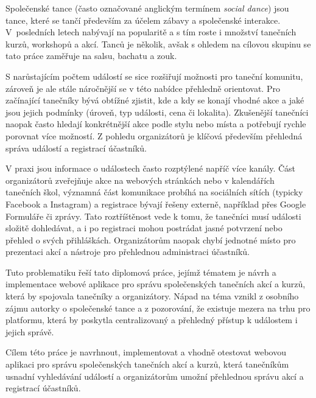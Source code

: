 Společenské tance (často označované anglickým termínem \emph{social dance}) jsou tance, které se tančí především za účelem zábavy a společenské interakce. V~posledních letech nabývají na popularitě a s tím roste i množství tanečních kurzů, workshopů a akcí. Tanců je několik, avšak s ohledem na cílovou skupinu se tato práce zaměřuje na salsu, bachatu a zouk.

S narůstajícím počtem událostí se sice rozšiřují možnosti pro taneční komunitu, zároveň je ale stále náročnější se v této nabídce přehledně orientovat. Pro začínající tanečníky bývá obtížné zjistit, kde a kdy se konají vhodné akce a jaké jsou jejich podmínky (úroveň, typ události, cena či lokalita). Zkušenější tanečníci naopak často hledají konkrétnější akce podle stylu nebo místa a potřebují rychle porovnat více možností. Z pohledu organizátorů je klíčová především přehledná správa událostí a registrací účastníků.

V praxi jsou informace o událostech často rozptýlené napříč více kanály. Část organizátorů zveřejňuje akce na webových stránkách nebo v kalendářích tanečních škol, významná část komunikace probíhá na sociálních sítích (typicky Facebook a Instagram) a registrace bývají řešeny externě, například přes Google Formuláře či zprávy. Tato roztříštěnost vede k tomu, že tanečníci musí události složitě dohledávat, a i po registraci mohou postrádat jasné potvrzení nebo přehled o svých přihláškách. Organizátorům naopak chybí jednotné místo pro prezentaci akcí a nástroje pro přehlednou administraci účastníků.

Tuto problematiku řeší tato diplomová práce, jejímž tématem je návrh a implementace webové aplikace pro správu společenských tanečních akcí a kurzů, která by spojovala tanečníky a organizátory. Nápad na téma vznikl z osobního zájmu autorky o společenské tance a z pozorování, že existuje mezera na trhu pro platformu, která by poskytla centralizovaný a přehledný přístup k událostem i jejich správě.

Cílem této práce je navrhnout, implementovat a vhodně otestovat webovou aplikaci pro správu společenských tanečních akcí a kurzů, která tanečníkům usnadní vyhledávání událostí a organizátorům umožní přehlednou správu akcí a registrací účastníků.